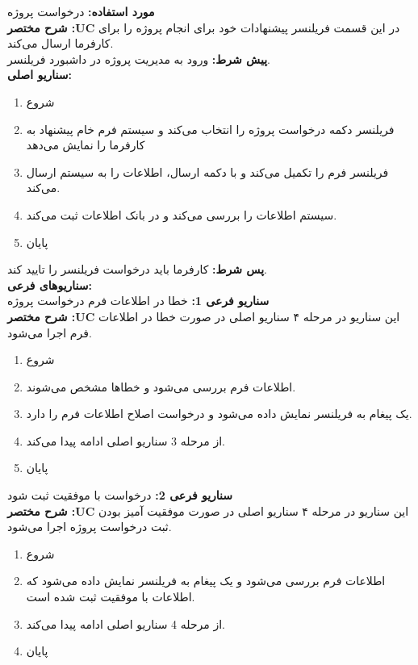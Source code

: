 \textbf{مورد استفاده:}
درخواست پروژه
\\
\textbf{شرح مختصر :UC}
در این قسمت فریلنسر پیشنهادات خود برای انجام پروژه را برای کارفرما ارسال می‌کند.
\\
\textbf{پيش شرط:}
ورود به مدیریت پروژه در داشبورد فریلنسر.
\\
\textbf{سناريو اصلی:}
\begin{enumerate}
\item
شروع
\item
فریلنسر دکمه درخواست پروژه را انتخاب می‌کند و سیستم فرم خام پیشنهاد به کارفرما را نمایش می‌دهد
\item
فریلنسر فرم را تکمیل می‌کند و با دکمه ارسال، اطلاعات را به سیستم ارسال می‌کند.
\item
سیستم اطلاعات را بررسی می‌کند و در بانک اطلاعات ثبت می‌کند.
\item
پایان
\end{enumerate}

\noindent
\textbf{پس شرط:}
کارفرما باید درخواست فریلنسر را تایید کند.
\\
\textbf{سناريوهای فرعی:}
\\
\textbf{سناريو فرعی 1:}
خطا در اطلاعات فرم درخواست پروژه
\\
\textbf{شرح مختصر :UC}
این سناریو در مرحله ۴ سناریو اصلی در صورت خطا در اطلاعات فرم اجرا می‌شود.
\begin{enumerate}
\item
شروع
\item
اطلاعات فرم بررسی می‌شود و خطاها مشخص می‌شوند.
\item
یک پیغام به فریلنسر نمایش داده می‌شود و درخواست اصلاح اطلاعات فرم را دارد.
\item
از مرحله 3 سناریو اصلی ادامه پیدا می‌کند.
\item
پایان
\end{enumerate}

\noindent
\textbf{سناريو فرعی 2:}
درخواست با موفقیت ثبت شود
\\
\textbf{شرح مختصر :UC}
این سناریو در مرحله ۴ سناریو اصلی در صورت موفقیت آمیز بودن ثبت درخواست پروژه اجرا می‌شود.
\begin{enumerate}
\item
شروع
\item
اطلاعات فرم بررسی می‌شود و یک پیغام به فریلنسر نمایش داده می‌شود که اطلاعات با موفقیت ثبت شده است.
\item
از مرحله 4 سناریو اصلی ادامه پیدا می‌کند.
\item
پایان
\end{enumerate}

